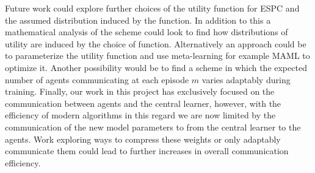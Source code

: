 Future work could explore further choices of the utility function for ESPC and the assumed distribution induced by the function. In addition to this a mathematical analysis of the scheme could look to find how distributions of utility are induced by the choice of function. Alternatively an approach could be to parameterize the utility function and use meta-learning for example MAML \cite{MAML} to optimize it. Another possibility would be to find a scheme in which the expected number of agents communicating at each episode $m$ varies adaptably during training. Finally, our work in this project has exclusively focused on the communication between agents and the central learner, however, with the efficiency of modern algorithms in this regard we are now limited by the communication of the new model parameters to from the central learner to the agents. Work exploring ways to compress these weights or only adaptably communicate them could lead to further increases in overall communication efficiency.